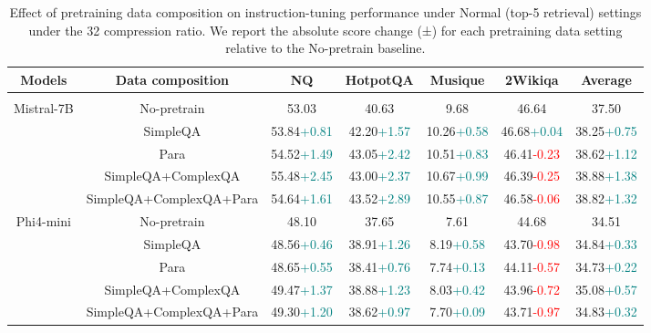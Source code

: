 \documentclass{applemlr}
\numberwithin{equation}{section}
\begin{document}
\begin{table}[H]
\centering
\scriptsize
\begin{tabular}{ccccccc}
\hline
Models & Data composition & NQ & HotpotQA& Musique& 2Wikiqa & Average \\
\hline
\rowcolor{gray!15}
\multicolumn{7}{c}{\textbf{Normal}} \\
\multirow{5}{*}{Mistral-7B} & No-pretrain & 53.03 & 40.63 & 9.68 & 46.64 & 37.50 \\
 & SimpleQA & 53.84{\tiny\textcolor{teal}{+0.81}} & 42.20{\tiny\textcolor{teal}{+1.57}} & 10.26{\tiny\textcolor{teal}{+0.58}} & 46.68{\tiny\textcolor{teal}{+0.04}} & 38.25{\tiny\textcolor{teal}{+0.75}} \\
 & Para & 54.52{\tiny\textcolor{teal}{+1.49}} & 43.05{\tiny\textcolor{teal}{+2.42}} & 10.51{\tiny\textcolor{teal}{+0.83}} & 46.41{\tiny\textcolor{red}{-0.23}} & 38.62{\tiny\textcolor{teal}{+1.12}} \\
 & SimpleQA+ComplexQA & 55.48{\tiny\textcolor{teal}{+2.45}} & 43.00{\tiny\textcolor{teal}{+2.37}} & 10.67{\tiny\textcolor{teal}{+0.99}} & 46.39{\tiny\textcolor{red}{-0.25}} & 38.88{\tiny\textcolor{teal}{+1.38}} \\
 & SimpleQA+ComplexQA+Para & 54.64{\tiny\textcolor{teal}{+1.61}} & 43.52{\tiny\textcolor{teal}{+2.89}} & 10.55{\tiny\textcolor{teal}{+0.87}} & 46.58{\tiny\textcolor{red}{-0.06}} & 38.82{\tiny\textcolor{teal}{+1.32}} \\
\hline
\multirow{5}{*}{Phi4-mini} & No-pretrain & 48.10 & 37.65 & 7.61 & 44.68 & 34.51 \\
 & SimpleQA & 48.56{\tiny\textcolor{teal}{+0.46}} & 38.91{\tiny\textcolor{teal}{+1.26}} & 8.19{\tiny\textcolor{teal}{+0.58}} & 43.70{\tiny\textcolor{red}{-0.98}} & 34.84{\tiny\textcolor{teal}{+0.33}} \\
 & Para & 48.65{\tiny\textcolor{teal}{+0.55}} & 38.41{\tiny\textcolor{teal}{+0.76}} & 7.74{\tiny\textcolor{teal}{+0.13}} & 44.11{\tiny\textcolor{red}{-0.57}} & 34.73{\tiny\textcolor{teal}{+0.22}} \\
 & SimpleQA+ComplexQA & 49.47{\tiny\textcolor{teal}{+1.37}} & 38.88{\tiny\textcolor{teal}{+1.23}} & 8.03{\tiny\textcolor{teal}{+0.42}} & 43.96{\tiny\textcolor{red}{-0.72}} & 35.08{\tiny\textcolor{teal}{+0.57}} \\
 & SimpleQA+ComplexQA+Para & 49.30{\tiny\textcolor{teal}{+1.20}} & 38.62{\tiny\textcolor{teal}{+0.97}} & 7.70{\tiny\textcolor{teal}{+0.09}} & 43.71{\tiny\textcolor{red}{-0.97}} & 34.83{\tiny\textcolor{teal}{+0.32}} \\
\toprule
\end{tabular}
\caption{Effect of pretraining data composition on instruction-tuning performance
under Normal (top-5 retrieval) settings under the 32 compression ratio. We report the absolute score change (±) for each pretraining data setting relative to the No-pretrain baseline.}
\label{data_composition1}
\end{table}
\end{document}
